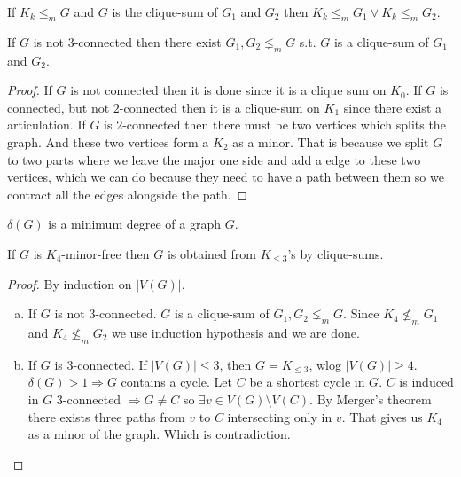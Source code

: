 \begin{lemma}
	If $K_{k} \leq_{m} G$ and $G$ is the clique-sum of $G_{1}$ and $G_{2}$ then $K_{k} \leq_{m} G_{1} \lor K_{k} \leq_{m} G_{2}$.
\end{lemma}

\begin{lemma}
	If $G$ is not $3$-connected then there exist $G_{1}, G_{2} \lneq_{m} G$ s.t. $G$ is a clique-sum of $G_{1}$ and $G_{2}$.
\end{lemma}

\begin{proof}
	If $G$ is not connected then it is done since it is a clique sum on $K_{0}$. If $G$ is connected, but not $2$-connected then it is a clique-sum on $K_{1}$ since there exist a articulation. If $G$ is $2$-connected then there must be two vertices which splits the graph. And these two vertices form a $K_{2}$ as a minor. That is because we split $G$ to two parts where we leave the major one side and add a edge to these two vertices, which we can do because they need to have a path between them so we contract all the edges alongside the path.
\end{proof}

\begin{defn}
	$\delta(G)$ is a minimum degree of a graph $G$.
\end{defn}

\begin{thm}
	If $G$ is $K_{4}$-minor-free then $G$ is obtained from $K_{\leq 3}$'s by clique-sums.
\end{thm}

\begin{proof}
	By induction on $|V(G)|$.
	
	\begin{enumerate}[(a)]
		\item If $G$ is not 3-connected. $G$ is a clique-sum of $G_{1},G_{2} \lneq_{m} G$. Since $K_{4} \nleq_{m} G_{1}$ and $K_{4} \nleq_{m} G_{2}$ we use induction hypothesis and we are done.
		\item If $G$ is 3-connected. If $|V(G)| \leq 3$, then $G = K_{\leq 3}$, wlog $|V(G)| \geq 4$. $\delta(G) > 1 \Rightarrow G$ contains a cycle. Let $C$ be a shortest cycle in $G$. $C$ is induced in $G$ 3-connected $\Rightarrow G \neq C$ so $\exists v \in V(G) \setminus V(C)$. By Merger's theorem there exists three paths from $v$ to $C$ intersecting only in $v$. That gives us $K_{4}$ as a minor of the graph. Which is contradiction.
	\end{enumerate}
\end{proof}

